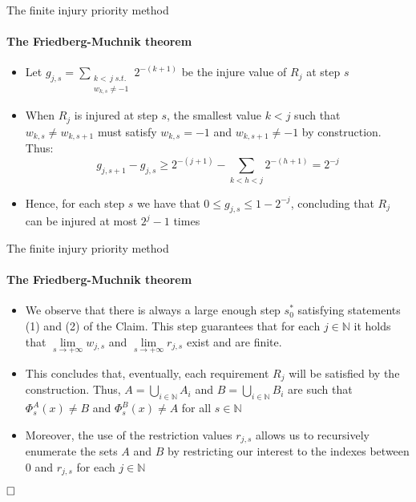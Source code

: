 \documentclass{beamer}
\newcommand{\N}{\mathbb{N}}                     %
\begin{document}
\begin{frame}{The finite injury priority method}
\framesubtitle{The Friedberg-Muchnik theorem}
    \begin{itemize}[<+->]
        \item Let $g_{j,s} = \sum\limits_{\substack{k <\, j \; s.t. \\ w_{k,s} \neq -1}} 2^{-(k+1)}$ be the injure value of $R_j$ at step $s$
        \item When $R_j$ is injured at step $s$, the smallest value $k < j$ such that $w_{k,s} \neq w_{k,s+1}$ must satisfy $w_{k,s} = -1$ and $w_{k,s+1} \neq -1$ by construction. Thus:
        \[g_{j,s+1} - g_{j,s} \geq 2^{-(j+1)} - \sum_{k < h < j} 2^{-(h+1)} = 2^{-j}\]

        \item Hence, for each step $s$ we have that $0 \leq g_{j,s} \leq 1-2^{-j}$, concluding that $R_j$ can be injured at most $2^{j}-1$ times
    \end{itemize}
\end{frame}

\begin{frame}{The finite injury priority method}
\framesubtitle{The Friedberg-Muchnik theorem}

    \begin{itemize}
        \item We observe that there is always a large enough step $s_0^*$ satisfying statements (1) and (2) of the Claim. This step guarantees that for each $j \in \N$ it holds that $\lim\limits_{s \to +\infty} w_{j,s}$ and $\lim\limits_{s \to +\infty} r_{j,s}$ exist and are finite.
        \item This concludes that, eventually, each requirement $R_j$ will be satisfied by the construction. Thus, $A = \bigcup\limits_{i \in \N} A_i$ and $B = \bigcup\limits_{i \in \N} B_i$ are such that $\Phi_s^A(x) \neq B$ and $\Phi_s^B(x) \neq A$ for all $s \in \N$
        \item Moreover, the use of the restriction values $r_{j,s}$ allows us to recursively enumerate the sets $A$ and $B$ by restricting our interest to the indexes between $0$ and $r_{j,s}$ for each $j \in \N$
    \end{itemize}

    $\hfill \square$

\end{frame}
\end{document}
